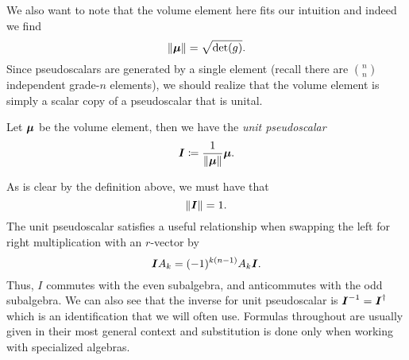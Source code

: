 We also want to note that the volume element here fits our intuition and indeed we find
\begin{equation}
\label{eq:pseudoscalar_norm}
\|\boldsymbol{\mu}\| = \sqrt{\det(g)}.
\end{equation}
Since pseudoscalars are generated by a single element (recall there are ${n \choose n}$ independent grade-$n$ elements), we should realize that the volume element is simply a scalar copy of a pseudoscalar that is unital.
\begin{definition}
Let $\boldsymbol{\mu}$ be the volume element, then we have the \emph{unit pseudoscalar}
\begin{equation}
\boldsymbol{I} \coloneqq \frac{1}{\|\boldsymbol{\mu}\|} \boldsymbol{\mu}.
\end{equation}
\end{definition}
As is clear by the definition above, we must have that
\begin{equation}
\|\boldsymbol{I}\| = 1.
\end{equation}
The unit pseudoscalar satisfies a useful relationship when swapping the left for right multiplication with an $r$-vector by
\begin{equation}
\boldsymbol{I} A_k = (-1)^{k(n-1)} A_k \boldsymbol{I}.
\end{equation}
Thus, $I$ commutes with the even subalgebra, and anticommutes with the odd subalgebra. We can also see that the inverse for unit pseudoscalar is $\boldsymbol{I}^{-1}=\boldsymbol{I}^\dagger$ which is an identification that we will often use. Formulas throughout are usually given in their most general context and substitution is done only when working with specialized algebras.  

